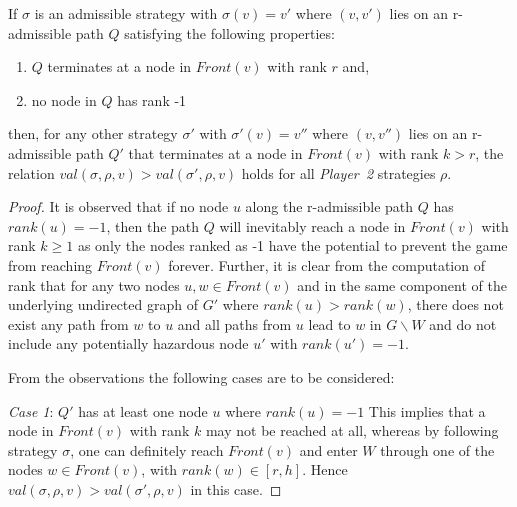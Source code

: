 \begin{lemma}
	\label{lemma3}
	If $\sigma$ is an admissible strategy with $\sigma(v) = v'$ where $(v,v')$ lies on an r-admissible path $Q$ satisfying the following properties:
	\begin{enumerate}
		\item $Q$ terminates at a node in $\mathit{Front}(v)$ with rank $r$ and,
		\item no node in $Q$ has rank -1
	\end{enumerate}
	then, for any other strategy $\sigma'$ with $\sigma'(v) = v''$ where $(v,v'')$ lies on an r-admissible path $Q'$ that terminates at a node in $\mathit{Front}(v)$ with rank $k > r$, the relation $val(\sigma,\rho,v) > val(\sigma',\rho,v)$ holds for all \textit{Player~2} strategies $\rho$.
\end{lemma}
\begin{proof}
	It is observed that if no node $u$ along the r-admissible path $Q$ has $rank(u) = -1$, then the path $Q$ will inevitably reach a node in $\mathit{Front}(v)$ with rank $k \geq 1$ as only the nodes ranked as -1 have the potential to prevent the game from reaching $\mathit{Front}(v)$ forever. 
	Further, it is clear from the computation of rank that for any two nodes $u,w \in \mathit{Front}(v)$ and in the same component of the underlying undirected graph of $G'$ where $rank(u) > rank(w)$, there does not exist any path from $w$ to $u$ and all paths from $u$ lead to $w$ in $G \backslash W$ and do not include any potentially hazardous node $u'$ with $rank(u') = -1$.
	
	From the observations the following cases are to be considered:
	
	\textit{Case 1}: $Q'$ has at least one node $u$ where $rank(u) = -1$
	\newline This implies that a node in $\mathit{Front}(v)$ with rank $k$ may not be reached at all, whereas by following strategy $\sigma$, one can definitely reach $\mathit{Front}(v)$ and enter $W$ through one of the nodes $w \in \mathit{Front}(v)$, with $rank(w) \in [r,h]$. Hence $val(\sigma,\rho,v) > val(\sigma',\rho,v)$ in this case.
	

\end{proof}
